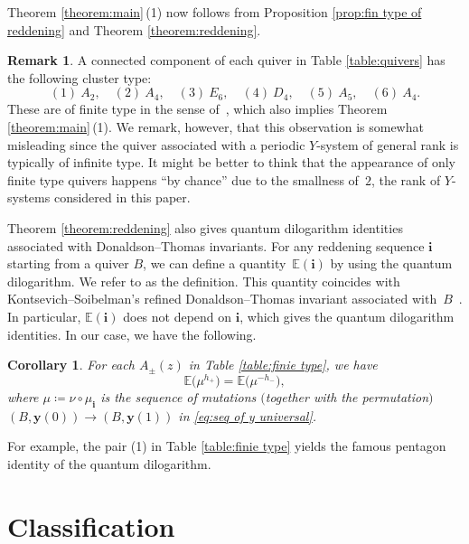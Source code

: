 \documentclass[pdftex]{sigma}
\numberwithin{equation}{section}
\newtheorem{Corollary}[Theorem]{Corollary}
\theoremstyle{definition}
\newtheorem{Remark}[Theorem]{Remark}
\begin{document}
Theorem \ref{theorem:main}\,(1) now follows from Proposition \ref{prop:fin type of reddening} and Theorem \ref{theorem:reddening}.

\begin{Remark}
 A connected component of each quiver in Table \ref{table:quivers} has the following cluster type:
\[
 (1) \ A_2, \quad (2) \ A_4, \quad (3) \ E_6, \quad (4) \ D_4, \quad (5) \ A_5, \quad (6) \ A_4.
\]
 These are of finite type in the sense of~\cite{FZ2}, which also implies Theorem \ref{theorem:main}\,(1).
 We remark, however, that this observation is somewhat misleading since the quiver associated with
 a periodic $Y$-system of general rank is typically of infinite type.
 It might be better to think that the appearance of only finite type quivers happens ``by chance''
 due to the smallness of~$2$, the rank of $Y$-systems considered in this paper.
\end{Remark}

Theorem \ref{theorem:reddening} also gives quantum dilogarithm identities
associated with Donaldson--Thomas invariants.
For any reddening sequence $\boldsymbol{i}$ starting from a quiver $B$, we can define
a quantity~$\mathbb{E}(\boldsymbol{i})$ by using the quantum dilogarithm.
We refer to \cite[Remark 6.6]{keller12} as the definition.
This quantity coincides with Kontsevich--Soibelman's refined
Donaldson--Thomas invariant associated with~$B$~\cite{keller12, Nagao10}.
In particular, $\mathbb{E}(\boldsymbol{i})$ does not depend on $\boldsymbol{i}$,
which gives the quantum dilogarithm identities. In our case, we have the following.

\begin{Corollary}\label{cor:q-dilog identity}
 For each $A_\pm (z)$ in Table {\rm\ref{table:finie type}},
 we have
 \begin{equation*}
 \mathbb{E}\bigl(\mu^{h_+}\bigr) = \mathbb{E}\bigl(\mu^{- h_-}\bigr),
 \end{equation*}
 where $\mu \coloneqq \nu \circ \mu_{\boldsymbol{i}}$ is the sequence of mutations $($together with the permutation$)$
 $(B, \boldsymbol{y}(0)) \to (B, \boldsymbol{y}(1))$ in \eqref{eq:seq of y universal}.
\end{Corollary}

For example, the pair (1) in Table \ref{table:finie type} yields
the famous pentagon identity of the quantum dilogarithm.

\section{Classification}
\end{document}
